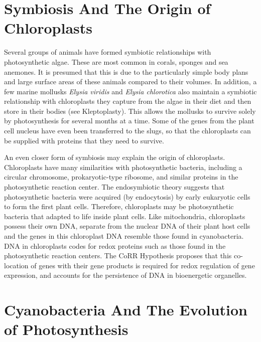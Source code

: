 \hypertarget{symbiosis-and-the-origin-of-chloroplasts}{%
\section{Symbiosis And The Origin of Chloroplasts}\label{symbiosis-and-the-origin-of-chloroplasts}}

Several groups of animals have formed symbiotic relationships with photosynthetic algae. These are most common in corals, sponges and sea anemones. It is presumed that this is due to the particularly simple body plans and large surface areas of these animals compared to their volumes. In addition, a few marine mollusks \emph{Elysia viridis} and \emph{Elysia chlorotica} also maintain a symbiotic relationship with chloroplasts they capture from the algae in their diet and then store in their bodies (see Kleptoplasty). This allows the mollusks to survive solely by photosynthesis for several months at a time. Some of the genes from the plant cell nucleus have even been transferred to the slugs, so that the chloroplasts can be supplied with proteins that they need to survive.

An even closer form of symbiosis may explain the origin of chloroplasts. Chloroplasts have many similarities with photosynthetic bacteria, including a circular chromosome, prokaryotic-type ribosome, and similar proteins in the photosynthetic reaction center. The endosymbiotic theory suggests that photosynthetic bacteria were acquired (by endocytosis) by early eukaryotic cells to form the first plant cells. Therefore, chloroplasts may be photosynthetic bacteria that adapted to life inside plant cells. Like mitochondria, chloroplasts possess their own DNA, separate from the nuclear DNA of their plant host cells and the genes in this chloroplast DNA resemble those found in cyanobacteria. DNA in chloroplasts codes for redox proteins such as those found in the photosynthetic reaction centers. The CoRR Hypothesis proposes that this co-location of genes with their gene products is required for redox regulation of gene expression, and accounts for the persistence of DNA in bioenergetic organelles.

\hypertarget{cyanobacteria-and-the-evolution-of-photosynthesis}{%
\section{Cyanobacteria And The Evolution of Photosynthesis}\label{cyanobacteria-and-the-evolution-of-photosynthesis}}

